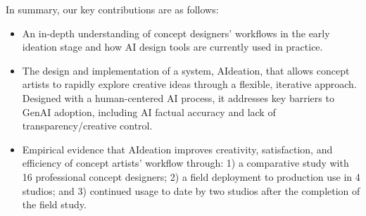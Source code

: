 In summary, our key contributions are as follows:
\begin{itemize}
    \item An in-depth understanding of concept designers' workflows in the early ideation stage and how AI design tools are currently used in practice. 
    \item The design and implementation of a system, AIdeation, that allows concept artists to rapidly explore creative ideas through a flexible, iterative approach. Designed with a human-centered AI process, it addresses key barriers to GenAI adoption, including AI factual accuracy and lack of transparency/creative control.
    \item Empirical evidence that AIdeation improves creativity, satisfaction, and efficiency of concept artists' workflow through: 1) a comparative study with 16 professional concept designers; 2) a field deployment to production use in 4 studios; and 3) continued usage to date by two studios after the completion of the field study.
\end{itemize}


